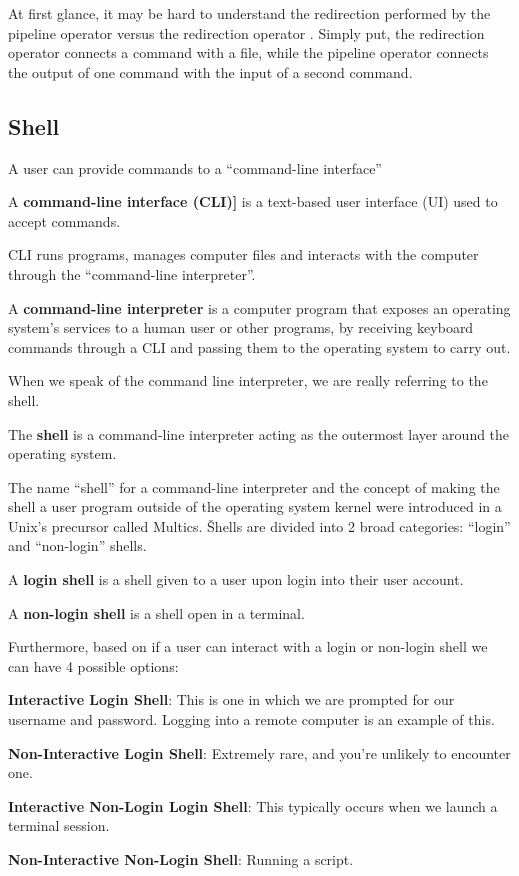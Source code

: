 At first glance, it may be hard to understand the redirection performed by the pipeline operator \code{|} versus the
redirection operator \code{>}. Simply put, the redirection operator connects a command with a file, while the pipeline
operator connects the output of one command with the input of a second command.

\subsection{Shell}

A user can provide commands to a ``command-line interface''

A \textbf{command-line interface (CLI)]} is a text-based user interface (UI) used to accept commands.
\ed

CLI runs programs, manages computer files and interacts with the computer through the ``command-line interpreter''.

A \textbf{command-line interpreter} is a computer program that exposes an operating system's services to a human user
or other programs, by receiving keyboard commands through a CLI and passing them to the operating system to carry out.
\ed

When we speak of the command line interpreter, we are really referring to the shell.

\bd[Shell]
The \textbf{shell} is a command-line interpreter acting as the outermost layer around the operating system.
\ed

The name ``shell'' for a command-line interpreter and the concept of making the shell a user program outside of the
operating system kernel were introduced in a Unix's precursor called Multics. \v

Shells are divided into 2 broad categories: ``login'' and ``non-login'' shells.

A \textbf{login shell} is a shell given to a user upon login into their user account.
\ed

A \textbf{non-login shell} is a shell open in a terminal.
\ed

Furthermore, based on if a user can interact with a login or non-login shell we can have 4 possible options:
\bit
\item \textbf{Interactive Login Shell}: This is one in which we are prompted for our username and password. Logging into
a remote computer is an example of this.
\item \textbf{Non-Interactive Login Shell}: Extremely rare, and you're unlikely to encounter one.
\item \textbf{Interactive Non-Login Login Shell}: This typically occurs when we launch a terminal session.
\item \textbf{Non-Interactive Non-Login Shell}: Running a script.
\eit


